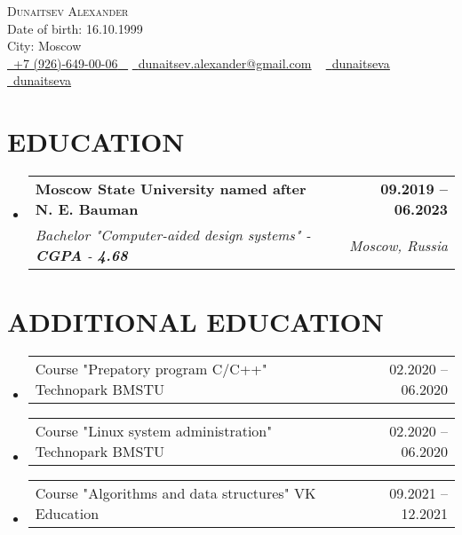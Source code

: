 \documentclass[letterpaper,11pt]{article}
\makeatletter
\newcommand{\resumeSubheading}[4]{
  \vspace{-2pt}\item
    \begin{tabular*}{1.0\textwidth}[t]{l@{\extracolsep{\fill}}r}
      \textbf{\large#1} & \textbf{\small #2} \\
      \textit{\large#3} & \textit{\small #4} \\
      
    \end{tabular*}\vspace{-7pt}
}
\newcommand{\resumeSubheadingAdditional}[2]{
	\vspace{-2pt}\item
	\begin{tabular*}{1.0\textwidth}[t]{l@{\extracolsep{\fill}}r}
		\large#1 & \small #2 \\
		
	\end{tabular*}\vspace{-7pt}
}
\newcommand{\resumeSubHeadingListStart}{\begin{itemize}[leftmargin=0.0in, label={}]}
\newcommand{\resumeSubHeadingListEnd}{\end{itemize}}
\makeatother
\begin{document}


\begin{center}
    {\Huge \scshape Dunaitsev Alexander} \\ \vspace{1pt}
    Date of birth: 16.10.1999 \\  City: Moscow \\ \vspace{1pt}
    \small \href{tel:+79266490006}{ \raisebox{-0.1\height}\faPhone\ \underline{+7 (926)-649-00-06} ~} \href{dunaitsev.alexander@gmail.com}{\raisebox{-0.2\height}\faEnvelope\  \underline{dunaitsev.alexander@gmail.com}} ~ 
    \href{https://github.com/dunaitseva}{\raisebox{-0.2\height}\faGithub\ \underline{dunaitseva}} ~
    \href{https://t.me/dunaitseva}{\raisebox{-0.2\height}\faTelegram\ \underline{dunaitseva}} ~
    \vspace{-8pt}
\end{center}


\section{EDUCATION}
  \resumeSubHeadingListStart
  \resumeSubheading
  {Moscow State University named after N. E. Bauman}{09.2019 -- 06.2023}
  {Bachelor "Computer-aided design systems" - \textbf{CGPA} - \textbf{4.68}}{Moscow, Russia}
  \resumeSubHeadingListEnd

\section{ADDITIONAL EDUCATION}
\resumeSubHeadingListStart
\resumeSubheadingAdditional
{Course "Prepatory program C/C++" Technopark BMSTU}{02.2020 -- 06.2020}
\resumeSubHeadingListEnd

\resumeSubHeadingListStart
\resumeSubheadingAdditional
{Course "Linux system administration" Technopark BMSTU}{02.2020 -- 06.2020}
\resumeSubHeadingListEnd

\resumeSubHeadingListStart
\resumeSubheadingAdditional
{Course "Algorithms and data structures" VK Education}{09.2021 -- 12.2021}
\resumeSubHeadingListEnd
\end{document}
